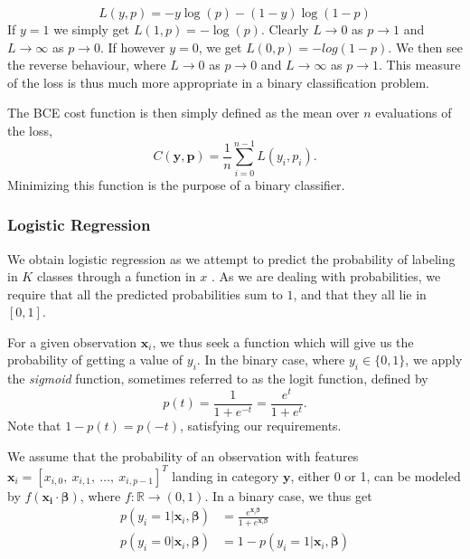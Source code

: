 \documentclass{article}
\theoremstyle{definition}
\begin{document}
\begin{equation*}
    L(y, p) = -y \log(p) - (1 - y)\log(1-p)
\end{equation*}
If $y=1$ we simply get $L(1,p) = -\log(p)$. Clearly $L \to 0$ as $p \to 1$ and $L \to \infty$ as $p \to 0$.
If however $y = 0$, we get $L(0,p) = -log(1-p)$. We then see the reverse behaviour, where $L \to 0$ as $p \to 0$ and $L \to \infty$ as $p \to 1$. This measure of the loss is thus much more appropriate in a binary classification problem.

The BCE cost function is then simply defined as the mean over $n$ evaluations of the loss, 
\begin{equation*}
    C(\boldsymbol{y}, \boldsymbol{p}) = \frac{1}{n} \sum_{i=0}^{n-1} L(y_i, p_i).
\end{equation*}
Minimizing this function is the purpose of a binary classifier.

\subsubsection{Logistic Regression}
We obtain logistic regression as we attempt to predict the probability of labeling in $K$ classes through a function in $x$ \parencite[p.~119]{Hastie2009}. As we are dealing with probabilities, we require that all the predicted probabilities sum to $1$, and that they all lie in $[0, 1]$.

For a given observation $\boldsymbol{x}_i$, we thus seek a function which will give us the probability of getting a value of $y_i$. In the binary case, where $y_i \in \{0, 1\}$, we apply the \textit{sigmoid} function, sometimes referred to as the logit function, defined by
\begin{equation*}
    p(t) = \frac{1}{1 + e^{-t}} = \frac{e^t}{1 + e^t}.
\end{equation*}
Note that $1 - p(t) = p(-t)$, satisfying our requirements.

We assume that the probability of an observation with features $\boldsymbol{x}_i = \left[x_{i,0}, \ x_{i, 1}, \ \ldots, \ x_{i, p-1} \right]^T$ landing in category $\boldsymbol{y}$, either 0 or 1, can be modeled by $f(\mathbf{x_i} \cdot \boldsymbol{\beta})$, where $f: \mathbb{R} \to (0, 1)$. In a binary case, we thus get
\begin{align*}
    p\left( y_i = 1 | \boldsymbol{x}_i, \boldsymbol{\beta} \right) &= \frac{ e^{\boldsymbol{x}_i \boldsymbol{\beta}}}{1 + e^{\boldsymbol{x}_i \boldsymbol{\beta}}} \\
    p\left( y_i = 0 | \boldsymbol{x}_i, \boldsymbol{\beta} \right) &= 1 - p\left( y_i = 1 | \boldsymbol{x}_i, \boldsymbol{\beta} \right)
\end{align*}
\end{document}
